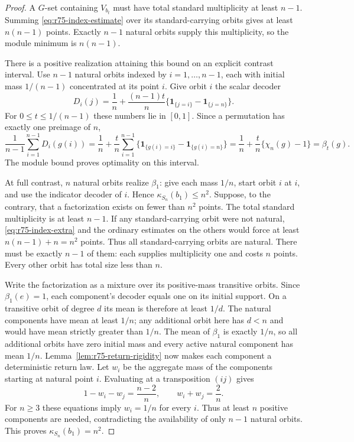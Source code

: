 \begin{proof}
A $G$-set containing $V_{b_t}$ must have total standard multiplicity
at least $n-1$. Summing \eqref{eq:r75-index-estimate} over its
standard-carrying orbits gives at least $n(n-1)$ points.
Exactly $n-1$ natural orbits supply this multiplicity, so the module
minimum is $n(n-1)$.

There is a positive realization attaining this bound on an explicit
contrast interval. Use $n-1$ natural orbits indexed by
$i=1,\ldots,n-1$, each with initial mass $1/(n-1)$ concentrated
at its point $i$. Give orbit $i$ the scalar decoder
\begin{equation}\label{eq:r75-symmetric-decoder}
 D_i(j)=\frac1n+\frac{(n-1)t}{n}
                 \{\mathbf1_{\{j=i\}}-\mathbf1_{\{j=n\}}\}.
\end{equation}
For $0\le t\le1/(n-1)$ these numbers lie in $[0,1]$.
Since a permutation has exactly one preimage of $n$,
\[
 \frac1{n-1}\sum_{i=1}^{n-1}D_i(g(i))
 =\frac1n+\frac tn
   \sum_{i=1}^{n-1}
    \{\mathbf1_{\{g(i)=i\}}-\mathbf1_{\{g(i)=n\}}\}
 =\frac1n+\frac tn\{\chi_n(g)-1\}=\beta_t(g).
\]
The module bound proves optimality on this interval.

At full contrast, $n$ natural orbits realize $\beta_1$: give
each mass $1/n$, start orbit $i$ at $i$, and use the indicator
decoder of $i$. Hence $\kappa_{S_n}(b_1)\le n^2$.
Suppose, to the contrary, that a factorization exists on fewer
than $n^2$ points. The total standard multiplicity is at least
$n-1$. If any standard-carrying orbit were not natural,
\eqref{eq:r75-index-extra} and the ordinary estimates on the
others would force at least $n(n-1)+n=n^2$ points. Thus all
standard-carrying orbits are natural. There must be exactly
$n-1$ of them: each supplies multiplicity one and costs $n$
points. Every other orbit has total size less than $n$.

Write the factorization as a mixture over its positive-mass
transitive orbits. Since $\beta_1(e)=1$, each component's
decoder equals one on its initial support. On a transitive orbit
of degree $d$ its mean is therefore at least $1/d$.
The natural components have mean at least $1/n$; any additional
orbit here has $d<n$ and would have mean strictly greater than
$1/n$. The mean of $\beta_1$ is exactly $1/n$, so all additional
orbits have zero initial mass and every active natural component
has mean $1/n$. Lemma~\ref{lem:r75-return-rigidity} now makes
each component a deterministic return law. Let $w_i$ be the
aggregate mass of the components starting at natural point $i$.
Evaluating at a transposition $(ij)$ gives
\[
 1-w_i-w_j=\frac{n-2}{n},
 \qquad w_i+w_j=\frac2n.
\]
For $n\ge3$ these equations imply $w_i=1/n$ for every $i$.
Thus at least $n$ positive components are needed, contradicting
the availability of only $n-1$ natural orbits. This proves
$\kappa_{S_n}(b_1)=n^2$.


\end{proof}
